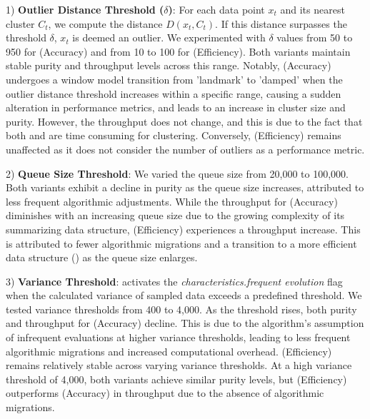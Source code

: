 1) \textbf{Outlier Distance Threshold ($\delta$)}: For each data point $x_t$ and its nearest cluster $C_t$, we compute the distance $D(x_t, C_t)$. If this distance surpasses the threshold $\delta$, $x_t$ is deemed an outlier. We experimented with $\delta$ values from 50 to 950 for \algo (Accuracy) and from 10 to 100 for \algo (Efficiency). Both variants maintain stable purity and throughput levels across this range. Notably, \algo (Accuracy) undergoes a window model transition from 'landmark' to 'damped' when the outlier distance threshold increases within a specific range, causing a sudden alteration in performance metrics, and leads to an increase in cluster size and purity. However, the throughput does not change, and this is due to the fact that both \landmark and \damped are time consuming for clustering. Conversely, \algo (Efficiency) remains unaffected as it does not consider the number of outliers as a performance metric.

2) \textbf{Queue Size Threshold}: We varied the queue size from 20,000 to 100,000. Both variants exhibit a decline in purity as the queue size increases, attributed to less frequent algorithmic adjustments. While the throughput for \algo (Accuracy) diminishes with an increasing queue size due to the growing complexity of its summarizing data structure, \algo (Efficiency) experiences a throughput increase. This is attributed to fewer algorithmic migrations and a transition to a more efficient data structure (\Grids) as the queue size enlarges.

3) \textbf{Variance Threshold}: \algo activates the \textit{characteristics.frequent evolution} flag when the calculated variance of sampled data exceeds a predefined threshold. We tested variance thresholds from 400 to 4,000. As the threshold rises, both purity and throughput for \algo (Accuracy) decline. This is due to the algorithm's assumption of infrequent evaluations at higher variance thresholds, leading to less frequent algorithmic migrations and increased computational overhead. \algo (Efficiency) remains relatively stable across varying variance thresholds. At a high variance threshold of 4,000, both variants achieve similar purity levels, but \algo (Efficiency) outperforms \algo (Accuracy) in throughput due to the absence of algorithmic migrations.

